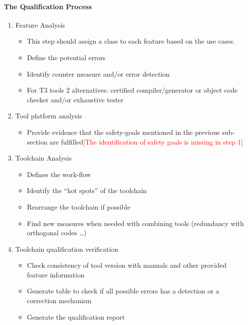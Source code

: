 \paragraph{The Qualification Process}

\begin{enumerate}
\item Feature Analysis
  \begin{itemize}
  \item This step should assign a class to each feature based on the use cases.
  \item Define the potential errors
  \item Identify counter measure and/or error detection
  \item For T3 tools 2 alternatives:  certified compiler/generator or
    object code checker and/or exhaustive tester
  \end{itemize}
\item Tool platform  analysis 
  \begin{itemize}
  \item Provide evidence that the safety-goals mentioned in the
    previous sub-section are fulfilled\textcolor{red}{[The identification of safety goals is missing in step 1]}
  \end{itemize}
\item Toolchain Analysis
  \begin{itemize}
  \item Defines the work-flow
  \item Identify the ``hot spots'' of the toolchain
  \item Rearrange the toolchain if possible
  \item Find new measures when needed with combining tools (redundancy with orthogonal
    codes \ldots{})
  \end{itemize}
\item Toolchain qualification verification 
  \begin{itemize}
  \item Check consistency of tool version with  manuals and other
    provided feature information
  \item Generate table to  check if all possible errors has a
    detection or a correction mechanism
\item Generate the qualification report
  \end{itemize}

\end{enumerate}







